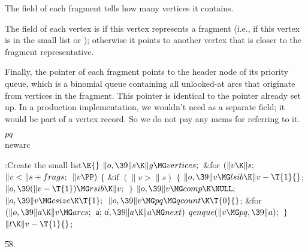 The  field of each fragment tells how many vertices it contains.

The  field of each vertex is \PB{$\NULL$} if this vertex
represents a
fragment (i.e., if this vertex is in the small list or );
otherwise it points to another vertex that is closer to the fragment
representative.

Finally, the  pointer of each fragment points to the header node of
its priority queue, which is a binomial queue containing all
unlooked-at arcs that originate from vertices in the fragment.
This pointer is identical to the  pointer already set up.
In a production implementation, we wouldn't need  as a
separate field; it would be part of a vertex record. So we do not
pay any mems for referring to it.

\Y\B\4\D$\\{pq}$ \5
\\{newarc}\par
\Y\B\4:Create the small list\X${}\E{}$\6
$\|o,\39\|s\K\|g\MG\\{vertices};{}$\6
\&{for} ${}(\|v\K\|s;{}$ ${}\|v<\|s+\\{frags};{}$ ${}\|v\PP){}$\5
${}\{{}$\1\6
\&{if} ${}(\|v>\|s){}$\5
${}\{{}$\1\6
${}\|o,\39\|v\MG\\{lsib}\K\|v-\T{1}{}$;\5
${}\|o,\39(\|v-\T{1})\MG\\{rsib}\K\|v;{}$\6
\4${}\}{}$\2\6
${}\|o,\39\|v\MG\\{comp}\K\NULL;{}$\6
${}\|o,\39\|v\MG\\{csize}\K\T{1};{}$\6
${}\|o,\39\|v\MG\\{pq}\MG\\{qcount}\K\T{0}{}$;\6
\&{for} ${}(\|o,\39\|a\K\|v\MG\\{arcs};{}$ \|a; \|o${},\39\|a\K\|a\MG%
\\{next}){}$\1\5
${}\\{qenque}(\|v\MG\\{pq},\39\|a);{}$\2\6
\4${}\}{}$\2\6
${}\|t\K\|v-\T{1}{}$;\par
\U58.\fi

